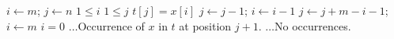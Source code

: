 \begin{codebox}
\li \(i \gets m\); \(j \gets n\)
\li \While \(1 \leqslant i\) \LogAnd \(1 \leqslant j\)
\li \Do \If \(t[j] = x[i]\)
\li	  \Then \(j \gets j - 1\); \(i \gets i - 1\)
\li	  \Else \(j \gets j + m - i - 1\); \(i \gets m\)
          \End 
    \End
\li \If \(i = 0\) 
\li \Then \(\ldots\)\>\>\>\Comment Occurrence of \(x\) in \(t\) at position \(j + 1\).
\li \Else \(\ldots\)\>\>\>\Comment No occurrences. 
    \End
\end{codebox}
